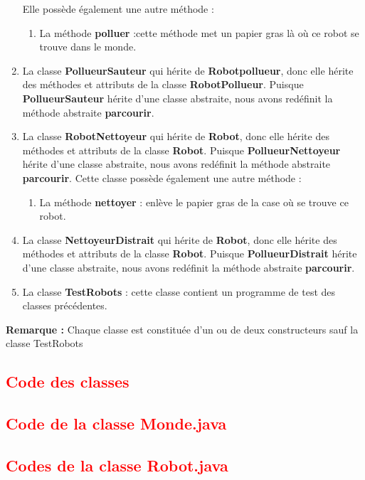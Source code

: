 \documentclass{article}
\begin{document}
\begin{enumerate}
		Elle possède également une autre méthode :
		\begin{enumerate}
			\item La méthode \textbf{polluer} :cette méthode met un	papier	gras là	où ce robot se trouve dans le monde.
		\end{enumerate}
		\item La classe \textbf{PollueurSauteur} qui hérite de \textbf{Robotpollueur}, donc elle hérite des méthodes et attributs de la classe \textbf{RobotPollueur}. Puisque \textbf{PollueurSauteur} hérite d'une classe abstraite, nous avons redéfinit la méthode abstraite \textbf{parcourir}.
		\item La classe \textbf{RobotNettoyeur} qui hérite de \textbf{Robot}, donc elle hérite des méthodes et attributs de la classe \textbf{Robot}. Puisque \textbf{PollueurNettoyeur} hérite d'une classe abstraite, nous avons redéfinit la méthode abstraite \textbf{parcourir}.
		Cette classe possède également une autre méthode :
		\begin{enumerate}
			\item La méthode \textbf{nettoyer} : enlève	le	papier gras de	la	case où se trouve ce robot.
		\end{enumerate}
		\item La classe \textbf{NettoyeurDistrait} qui hérite de \textbf{Robot}, donc elle hérite des méthodes et attributs de la classe \textbf{Robot}. Puisque \textbf{PollueurDistrait} hérite d'une classe abstraite, nous avons redéfinit la méthode abstraite \textbf{parcourir}.
		\item La classe \textbf{TestRobots} : cette classe contient	un	programme	de	test	des	classes	précédentes.
	\end{enumerate}
\textbf{Remarque :} Chaque classe est constituée d'un ou de deux constructeurs sauf la classe TestRobots
	\newpage
	\textcolor{red}{\section*{Code des classes}}
	\textcolor{red}{\subsection*{Code de la classe Monde.java}}
	
	\textcolor{red}{\subsection*{Codes de la classe Robot.java}}
\end{document}
